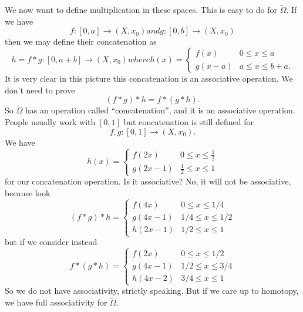 We now want to define multiplication in these spaces. This is
easy to do for $\widetilde{\Omega}$. If we have
\begin{subequations}
\begin{equation}
f\colon[0,a]\to(X,x_0)
\end{equation}
and
\begin{equation}
g\colon[0,b]\to(X,x_0)
\end{equation}
\end{subequations}
then we may define their concatenation as
\begin{subequations}
\begin{equation}
h=f*g\colon[0,a+b]\to(X,x_0)
\end{equation}
where
\begin{equation}
h(x) = \begin{cases}f(x) & 0\leq x\leq a\\
g(x-a) & a\leq x\leq b+a.
\end{cases}
\end{equation}
\end{subequations}
It is very clear in this picture this concatenation is an
associative operation. We don't need to prove
\begin{equation}
(f*g)*h=f*(g*h).
\end{equation}
So $\widetilde{\Omega}$ has an operation called
``concatenation'', and it is an associative operation. People
usually work with $[0,1]$ but concatenation is still defined for
\begin{equation}
f,g\colon[0,1]\to(X,x_0).
\end{equation}
We have
\begin{equation}
h(x) = \begin{cases}f(2x) & 0\leq x\leq\frac{1}{2}\\
g(2x-1) & \frac{1}{2}\leq x\leq 1
\end{cases}
\end{equation}
for our concatenation operation. Is it associative? No, it will
not be associative, because look
\begin{equation}
(f*g)*h = \begin{cases}
f(4x) & 0\leq x\leq 1/4\\
g(4x-1) & 1/4\leq x\leq 1/2\\
h(2x-1) & 1/2\leq x\leq1
  \end{cases}
\end{equation}
but if we consider instead
\begin{equation}
f*(g*h) = 
\begin{cases}
f(2x) & 0\leq x\leq 1/2\\
g(4x-1) & 1/2\leq x\leq 3/4\\
h(4x-2) & 3/4\leq x\leq1
\end{cases}
\end{equation}
So we do not have associativity, strictly speaking. But if we
care up to homotopy, we have full associativity for
$\widetilde{\Omega}$. 


